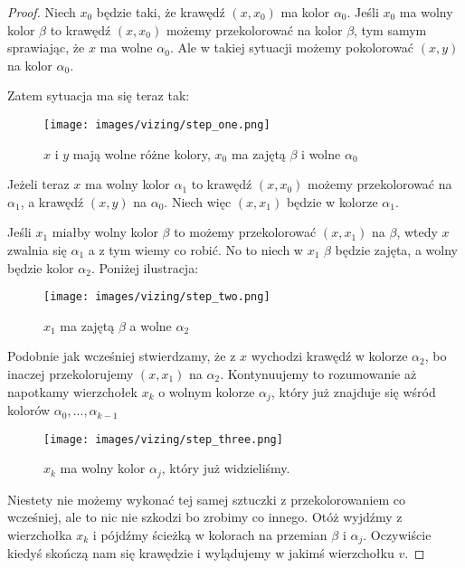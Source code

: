 \begin{proof}
        
        Niech $x_0$ będzie taki, że krawędź $(x, x_0)$ ma kolor $\alpha_0$. Jeśli $x_0$ ma wolny kolor $\beta$
        to krawędź $(x, x_0)$ możemy przekolorować na kolor $\beta$,
        tym samym sprawiając, że $x$ ma wolne $\alpha_0$.
        Ale w takiej sytuacji możemy pokolorować $(x, y)$ na kolor $\alpha_0$. 
        
        Zatem sytuacja ma się teraz tak:
        
        \begin{figure}[ht]
            \centering
            \texttt{[image: images/vizing/step\_one.png]}
            \caption{$x$ i $y$ mają wolne różne kolory, $x_0$ ma zajętą $\beta$ i wolne $\alpha_0$}
        \end{figure}
        
        Jeżeli teraz $x$ ma wolny kolor $\alpha_1$ to krawędź $(x, x_0)$
        możemy przekolorować na $\alpha_1$, a krawędź $(x, y)$ na $\alpha_0$. Niech więc $(x, x_1)$ będzie w kolorze $\alpha_1$.
        
        Jeśli $x_1$ miałby wolny kolor $\beta$ to możemy przekolorować $(x, x_1)$ na $\beta$, wtedy $x$ zwalnia się $\alpha_1$ a z tym wiemy co robić. 
        No to niech w $x_1$ $\beta$ będzie zajęta, a wolny będzie kolor $\alpha_2$. Poniżej ilustracja:
        
        \begin{figure}[ht]
            \centering
            \texttt{[image: images/vizing/step\_two.png]}
            \caption{$x_1$ ma zajętą $\beta$ a wolne $\alpha_2$}
        \end{figure}
        
        Podobnie jak wcześniej stwierdzamy, że z $x$ wychodzi krawędź w kolorze $\alpha_2$, bo inaczej przekolorujemy $(x, x_1)$ na $\alpha_2$. Kontynuujemy to rozumowanie aż napotkamy wierzchołek $x_k$ o wolnym kolorze $\alpha_j$, który już znajduje się wśród kolorów $\alpha_0, ..., \alpha_{k-1}$
        
        
        \begin{figure}[ht]
            \centering
            \texttt{[image: images/vizing/step\_three.png]}
            \caption{$x_k$ ma wolny kolor $\alpha_j$, który już widzieliśmy.}
        \end{figure}
        
        Niestety nie możemy wykonać tej samej sztuczki z przekolorowaniem co wcześniej, ale to nic nie szkodzi bo zrobimy co innego.
        Otóż wyjdźmy z wierzchołka $x_k$ i pójdźmy ścieżką w kolorach na przemian $\beta$ i $\alpha_j$.
        Oczywiście kiedyś skończą nam się krawędzie i wylądujemy w jakimś wierzchołku $v$.
        

\end{proof}
